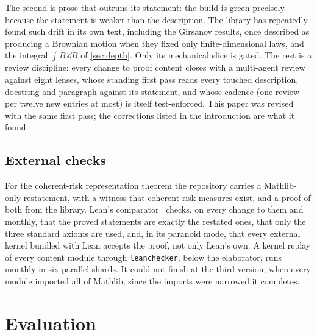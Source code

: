 \documentclass[11pt]{article}
\begin{document}
The second is prose that outruns its statement: the build is green precisely because the statement is weaker than the
description. The library has repeatedly found such drift in its own text, including the Girsanov results, once described as
producing a Brownian motion when they fixed only finite-dimensional laws, and the integral $\int B\,\dd B$ of
\cref{sec:depth}. Only its mechanical slice is gated. The rest is a review discipline: every change to proof content
closes with a multi-agent review against eight lenses, whose standing first pass reads every touched description, docstring
and paragraph against its statement, and whose cadence (one review per twelve new entries at most) is itself test-enforced.
This paper was revised with the same first pass; the corrections listed in the introduction are what it found.

\subsection{External checks}\label{sec:external}
For the coherent-risk representation theorem the repository carries a Mathlib-only restatement, with a witness that coherent
risk measures exist, and a proof of both from the library. Lean's comparator~\cite{Comparator} checks, on every change to
them and monthly, that the proved statements are exactly the restated ones, that only the three standard axioms are used, and,
in its paranoid mode, that every external kernel bundled with Lean accepts the proof, not only Lean's own. A kernel replay of
every content module through \texttt{leanchecker}, below the elaborator, runs monthly in six parallel shards. It could not
finish at the third version, when every module imported all of Mathlib; since the imports were narrowed it completes.

\section{Evaluation}\label{sec:evaluation}
\end{document}
